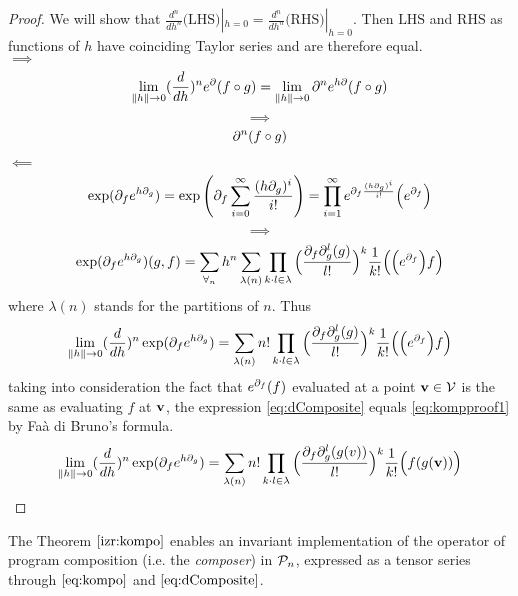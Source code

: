 \begin{proof}
  We will show that $\frac{d^n}{dh^n}\text{(LHS)}|_{h=0}=\frac{d^n}{dh^n}\text{(RHS)}|_{h=0}$. Then $\text{LHS}$ and $\text{RHS}$ as functions
  of $h$ have coinciding Taylor series and are therefore equal.\\
 $\implies$
 $$\lim\limits_{\lVert h\rVert\to 0}(\frac{d}{dh})^ne^\partial(f\circ g)=\lim\limits_{\lVert h\rVert\to 0}\partial^ne^{h\partial}(f\circ g)$$
 $$\implies$$
 \begin{equation}\label{eq:kompproof1}
 \partial^n(f\circ g)
 \end{equation}
 
 $\impliedby$
 $$\exp(\partial_fe^{h\partial_g})=\exp\left(\partial_f\sum\limits_{i=0}^{\infty}\frac{(h\partial_g)^i}{i!}\right)=\prod_{i=1}^{\infty}e^{\partial_f\frac{(h\partial_g)^i}{i!}}\Big(e^{\partial_f}\Big)$$
 $$\implies$$
 $$\exp(\partial_fe^{h\partial_g})(g,f)=\sum\limits_{\forall_n}h^n\sum\limits_{\lambda(n)}\prod\limits_{k\cdot l\in\lambda}\Big(\frac{\partial_f\partial_g^l(g)}{l!}\Big)^k\frac{1}{k!}\Big(\Big(e^{\partial_f}\Big)f\Big)$$
 where $\lambda(n)$ stands for the partitions of $n$. Thus
 \begin{equation}\label{eq:dComposite}
 \lim\limits_{\lVert h\rVert\to 0}(\frac{d}{dh})^n\exp(\partial_fe^{h\partial_g})=\sum\limits_{\lambda(n)}n!\prod\limits_{k\cdot l\in\lambda}\Big(\frac{\partial_f\partial_g^l(g)}{l!}\Big)^k\frac{1}{k!}\Big(\Big(e^{\partial_f}\Big)f\Big)
 \end{equation}
 taking into consideration the fact that $e^{\partial_f}(f)$ evaluated at a point $\mathbf{v}\in \mathcal{V}$ is the same as evaluating $f$ at $\mathbf{v}$, the expression \eqref{eq:dComposite} equals \eqref{eq:kompproof1} by Faà di Bruno's formula.
   \begin{equation}\label{eq:dCompositePoint}
   \lim\limits_{\lVert h\rVert\to 0}(\frac{d}{dh})^n\exp(\partial_fe^{h\partial_g})=\sum\limits_{\lambda(n)}n!\prod\limits_{k\cdot l\in\lambda}\Big(\frac{\partial_f\partial_g^l(g(v))}{l!}\Big)^k\frac{1}{k!}\Big(f(g(\mathbf{v}))\Big)
   \end{equation}
 \end{proof}       
 The Theorem $\ref{izr:kompo}$ enables an invariant implementation of the operator of program composition (i.e. the \emph{composer}) in $\mathcal{P}_n$, expressed as a tensor series through $\eqref{eq:kompo}$ and $\eqref{eq:dComposite}$. 
 

